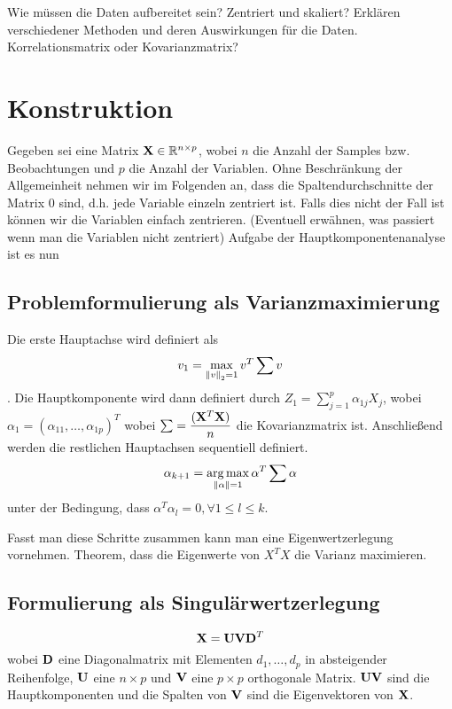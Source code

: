 Wie müssen die Daten aufbereitet sein? Zentriert und skaliert? Erklären verschiedener Methoden und deren Auswirkungen für die Daten. Korrelationsmatrix oder Kovarianzmatrix?




\section{Konstruktion}

Gegeben sei eine Matrix $\mathbf{X} \in \mathbb{R}^{n\times p}$, wobei $n$ die Anzahl der Samples bzw. Beobachtungen und $p$ die Anzahl der Variablen. Ohne Beschränkung der Allgemeinheit nehmen wir im Folgenden an, dass die Spaltendurchschnitte der Matrix 0 sind, d.h. jede Variable einzeln zentriert ist. Falls dies nicht der Fall ist können wir die Variablen einfach zentrieren. (Eventuell erwähnen, was passiert wenn man die Variablen nicht zentriert)
Aufgabe der Hauptkomponentenanalyse ist es nun

\subsection{Problemformulierung als Varianzmaximierung}
Die erste Hauptachse wird definiert als $$v_1 = \max_{\left\lVert v \right\rVert_2 = 1} v^T \sum v$$. Die Hauptkomponente wird dann definiert durch $Z_1 = \sum_{j=1}^{p} \alpha_{1j}X_j$, wobei $\alpha_1 = (\alpha_{11}, \ldots, \alpha_{1p})^T$
wobei $\sum = \dfrac{(\mathbf{X}^T\mathbf{X})}{n}$ die Kovarianzmatrix ist. Anschließend werden die restlichen Hauptachsen sequentiell definiert.
$$\alpha_{k+1} = \operatorname*{arg\,max}_{\left\lVert \alpha \right\rVert = 1} \alpha^T\sum\alpha$$ unter der Bedingung, dass $\alpha^T\alpha_l = 0, \forall 1 \leq l \leq k$.

\cite{zou_overview}

Fasst man diese Schritte zusammen kann man eine Eigenwertzerlegung vornehmen. Theorem, dass die Eigenwerte von $X^TX$ die Varianz maximieren.

\subsection{Formulierung als Singulärwertzerlegung}
$$ \mathbf{X} = \mathbf{U}\mathbf{V}\mathbf{D}^T $$
wobei $\mathbf{D}$ eine Diagonalmatrix mit Elementen $d_1,\ldots,d_p$ in absteigender Reihenfolge, $\mathbf{U}$ eine $n \times p$ und $\mathbf{V}$ eine $p \times p$ orthogonale Matrix.
$\mathbf{U}\mathbf{V}$ sind die Hauptkomponenten und die Spalten von $\mathbf{V}$ sind die Eigenvektoren von $\mathbf{X}$.

